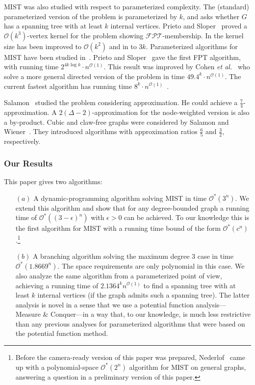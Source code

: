 \documentclass{llncs}
\newcommand{\longversion}[1]{#1}
\newcommand{\shortversion}[1]{}
\newcommand{\mc}{\mathcal}
\newcommand{\Oh}{{\mc{O}}}
\newcommand{\FPT}{\mbox{$\mc{FPT}$}}
\newcommand{\mist}{\textsc{MIST}\xspace}
\newcommand{\rt}{1.8669}
\newcommand{\rtkii}{2.1364}
\begin{document}
\mist was also studied with respect to parameterized complexity. The (standard) parameterized version of the problem is parameterized by $k$, and asks
whether $G$ 
has a spanning tree with at least $k$ internal vertices. Prieto and Sloper~\cite{PriSlo2003} proved a $\Oh(k^3)$-vertex kernel for the problem showing
\FPT-membership. In \cite{\longversion{Pri2005,}PriSlo2005} the kernel size has been improved to $\Oh(k^2)$ and in \cite{FominGST} to $3k$.
Parameterized algorithms for \mist have been studied in~\cite{CohenFGKSY09,FominGST,PriSlo2005}. Prieto and Sloper~\cite{PriSlo2005} gave the first
FPT algorithm, with running time $2^{4k \log k} \cdot n^{\Oh(1)}$. This result was improved by Cohen {\em et al.}~\cite{CohenFGKSY09} who solve a more
general directed version of the problem in time $49.4^k \cdot n^{\Oh(1)}$. The current fastest algorithm has running time $8^k \cdot
n^{\Oh(1)}$~\cite{FominGST}.

Salamon~\cite{Sal07} studied the problem considering approximation. He could achieve a $\frac{7}{4}$-approximation. A $2(\Delta-2)$-approximation for the node-weighted version is also a by-product. Cubic and claw-free graphs were considered by Salamon and Wiener~\cite{SalWie08}. They introduced algorithms with approximation ratios $\frac{6}{5}$ and $\frac{3}{2}$, respectively.

\subsubsection{Our Results} This paper gives two algorithms:\shortversion{\\}
\longversion{
\begin{enumerate}\itemsep.5pt
 \item[$(a)$]}
\shortversion{(a)} A dynamic-programming algorithm solving \mist in time $\Oh^*(3^n)$. We extend this algorithm and show that for any degree-bounded
graph a running time of $\Oh^*((3-\epsilon)^n)$ with $\epsilon >0$ can be achieved. To our knowledge this is the first algorithm for \mist with a
running time 
bound of the form $\Oh^*(c^n)$.\footnote{Before the camera-ready version of this paper was prepared, Nederlof~\cite{Nederlof09} came up with a
polynomial-space $\Oh^*(2^n)$ algorithm for \mist on general graphs, answering a question in a preliminary version of this paper.}
\shortversion{\\(b)}
 \longversion{\item[$(b)$]} A  \shortversion{polynomial-space }branching algorithm solving the maximum degree $3$ case in time $\Oh^*(\rt^n)$.
\longversion{The space requirements are only polynomial in this case. }We also analyze the same algorithm from a parameterized point of view,
achieving a running time of $\rtkii^k n^{\Oh(1)}$ to find a spanning tree with at least $k$ internal vertices (if
\shortversion{possible}\longversion{the graph admits such a spanning tree}). The latter analysis is novel in a sense that we use a potential function
analysis---Measure \& Conquer---in a way that, to our knowledge, is much less restrictive than any previous analyses for parameterized algorithms that
were based on the potential function method.
\longversion{\end{enumerate}}
\end{document}
